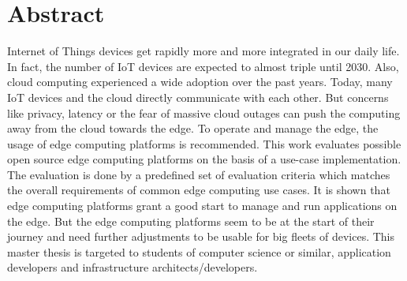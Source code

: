 \chapter*{Abstract}
Internet of Things devices get rapidly more and more integrated in our daily life. In fact, the number of IoT devices are expected to almost triple until 2030. Also, cloud computing experienced a wide adoption over the past years. Today, many IoT devices and the cloud directly communicate with each other. But concerns like privacy, latency or the fear of massive cloud outages can push the computing away from the cloud towards the edge. To operate and manage the edge, the usage of edge computing platforms is recommended. This work evaluates possible open source edge computing platforms on the basis of a use-case implementation. The evaluation is done by a predefined set of evaluation criteria which matches the overall requirements of common edge computing use cases. It is shown that edge computing platforms grant a good start to manage and run applications on the edge. But the edge computing platforms seem to be at the start of their journey and need further adjustments to be usable for big fleets of devices. This master thesis is targeted to students of computer science or similar, application developers and infrastructure architects/developers.